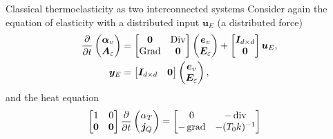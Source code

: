 \documentclass[aspectratio=169]{ISAE-Beamer}
\DeclareMathOperator*{\grad}{grad}
\DeclareMathOperator*{\Grad}{Grad}
\DeclareMathOperator*{\Div}{Div}
\renewcommand{\div}{\operatorname{div}}
\begin{document}
\begin{frame}{Classical thermoelasticity as two interconnected systems}
Consider again the equation of elasticity with a distributed input $\bm{u}_E$ (a distributed force)
\begin{equation*}
\begin{aligned}
\diffp{}{t}
\begin{pmatrix}
\bm{\alpha}_v \\
\bm{A}_{\varepsilon} \\
\end{pmatrix} &= 
\begin{bmatrix}
\bm{0} & \Div \\
\Grad & \bm{0} \\
\end{bmatrix}
\begin{pmatrix}
\bm{e}_v \\
\bm{E}_{\varepsilon} \\
\end{pmatrix} + 
\begin{bmatrix}
\bm{I}_{d\times d} \\
\bm{0} \\
\end{bmatrix}\bm{u}_E, \\
\bm{y}_E &= \begin{bmatrix}
\bm{I}_{d\times d} & \bm{0} \\
\end{bmatrix}
\begin{pmatrix}
\bm{e}_v \\
\bm{E}_{\varepsilon}
\end{pmatrix},
\end{aligned}
\end{equation*}
and the heat equation
\begin{equation*}
\begin{aligned}
\begin{bmatrix}
1 & 0 \\
\bm{0} & \bm{0} \\
\end{bmatrix}
\diffp{}{t}
\begin{pmatrix}
\alpha_T \\
\bm{j}_Q \\
\end{pmatrix} &= 
\begin{bmatrix}
0 & -\div \\
-\grad & -(T_0 k)^{-1} \\
\end{bmatrix}

\end{aligned}
\end{equation*}
\end{frame}
\end{document}
